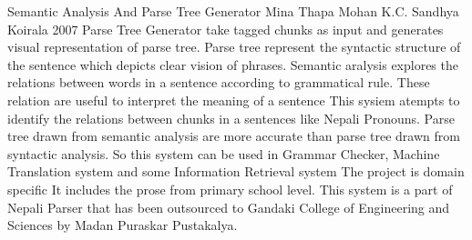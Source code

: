  \begin{conf-abstract}[]
{Semantic Analysis And Parse Tree Generator}
{
	Mina Thapa
	Mohan K.C.
	Sandhya Koirala
}
{2007}
Parse Tree Generator take tagged chunks as input and generates visual
representation of parse tree. Parse tree represent the syntactic structure of the
sentence which depicts clear vision of phrases.
Semantic aralysis explores the relations between words in a sentence
according to grammatical rule. These relation are useful to interpret the meaning
of a sentence This sysiem atempts to identify the relations between chunks in a
sentences like Nepali Pronouns.
Parse tree drawn from semantic analysis are more accurate than parse
tree drawn from syntactic analysis. So this system can be used in Grammar
Checker, Machine Translation system and some Information Retrieval system
The project is domain specific It includes the prose from primary
school level. This system is a part of Nepali Parser that has been outsourced to
Gandaki College of Engineering and Sciences by Madan Puraskar Pustakalya.
  \end{conf-abstract}